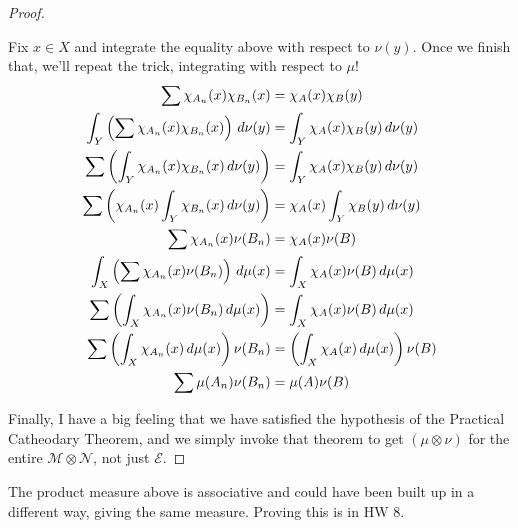 \documentclass[11pt,leqno,oneside]{amsbook}
\numberwithin{thm}{section}
\newcommand{\M}{\mathcal{M}}
\newcommand{\E}{\mathcal{E}}
\newcommand{\cN}{\mathcal{N}}
\newcommand{\ox}{\otimes}
\begin{document}
\begin{proof}
\begin{enumerate}[label=(\arabic{*})]
\begin{itemize}
        Fix $x \in X$ and integrate the equality above with respect to $\nu(y)$.  Once we finish that, we'll repeat the trick, integrating with respect to $\mu$!
        \begin{align*}
          \sum \chi_{A_n}(x)\chi_{B_n}(x) &= \chi_A(x)\chi_B(y) \\
          \int_Y\left(\sum \chi_{A_n}(x)\chi_{B_n}(x)\right)\, d\nu(y) &= \int_Y \chi_A(x)\chi_B(y) \, d\nu(y) \\
          \sum \left(\int_Y\chi_{A_n}(x)\chi_{B_n}(x)\, d\nu(y)\right) &= \int_Y \chi_A(x)\chi_B(y) \, d\nu(y) \\
          \sum \left(\chi_{A_n}(x)\int_Y\chi_{B_n}(x)\, d\nu(y)\right) &= \chi_A(x)\int_Y \chi_B(y) \, d\nu(y) \\
          \sum \chi_{A_n}(x)\nu(B_n) &= \chi_A(x)\nu(B) \\
          \int_X \left(\sum \chi_{A_n}(x)\nu(B_n)\right) \, d\mu(x) &= \int_X \chi_A(x)\nu(B)\, d\mu(x) \\
          \sum \left(\int_X \chi_{A_n}(x)\nu(B_n) \, d\mu(x)\right) &= \int_X \chi_A(x)\nu(B)\, d\mu(x) \\
          \sum \left(\int_X \chi_{A_n}(x) \, d\mu(x)\right)\nu(B_n) &= \left(\int_X \chi_A(x)\, d\mu(x)\right)\nu(B) \\
          \sum \mu(A_n)\nu(B_n) &= \mu(A)\nu(B)
        \end{align*}
      \end{itemize}

  \end{enumerate}
  Finally, I have a big feeling that we have satisfied the hypothesis of the Practical Catheodary Theorem, and we simply invoke that theorem to get $(\mu\ox\nu)$ for the entire $\M\ox\cN$, not just $\E$.
\end{proof}
\begin{thm}
  The product measure above is associative and could have been built up in a different way, giving the same measure.  Proving this is in HW 8.
\end{thm}
\end{document}
